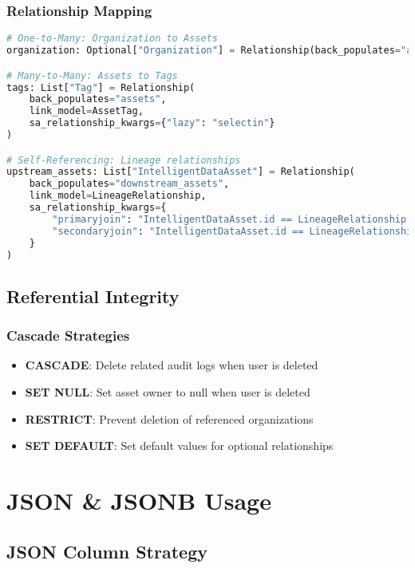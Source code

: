 \subsubsection{Relationship Mapping}
\begin{lstlisting}[language=Python, caption=Advanced Relationship Mapping]
# One-to-Many: Organization to Assets
organization: Optional["Organization"] = Relationship(back_populates="assets")

# Many-to-Many: Assets to Tags
tags: List["Tag"] = Relationship(
    back_populates="assets",
    link_model=AssetTag,
    sa_relationship_kwargs={"lazy": "selectin"}
)

# Self-Referencing: Lineage relationships
upstream_assets: List["IntelligentDataAsset"] = Relationship(
    back_populates="downstream_assets",
    link_model=LineageRelationship,
    sa_relationship_kwargs={
        "primaryjoin": "IntelligentDataAsset.id == LineageRelationship.downstream_id",
        "secondaryjoin": "IntelligentDataAsset.id == LineageRelationship.upstream_id"
    }
)
\end{lstlisting}

\subsection{Referential Integrity}

\subsubsection{Cascade Strategies}
\begin{itemize}
    \item \textbf{CASCADE}: Delete related audit logs when user is deleted
    \item \textbf{SET NULL}: Set asset owner to null when user is deleted
    \item \textbf{RESTRICT}: Prevent deletion of referenced organizations
    \item \textbf{SET DEFAULT}: Set default values for optional relationships
\end{itemize}

\section{JSON \& JSONB Usage}

\subsection{JSON Column Strategy}


